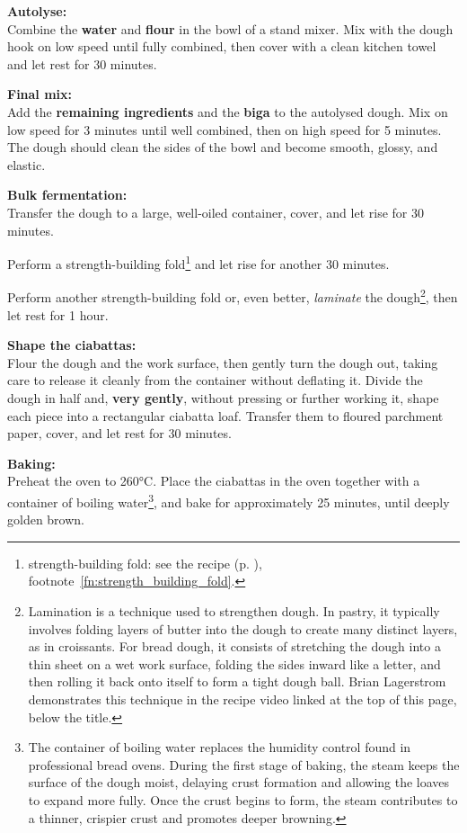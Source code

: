 \textbf{Autolyse:} \\
Combine the \textbf{water} and \textbf{flour} in the bowl of a stand mixer.
Mix with the dough hook on low speed until fully combined, then cover with a clean kitchen towel and let rest for 30 minutes.

\textbf{Final mix:} \\
Add the \textbf{remaining ingredients} and the \textbf{biga} to the autolysed dough. Mix on low speed for 3 minutes until well combined, then on high speed for 5 minutes.
The dough should clean the sides of the bowl and become smooth, glossy, and elastic.

\textbf{Bulk fermentation:} \\
Transfer the dough to a large, well-oiled container, cover, and let rise for 30 minutes.

Perform a strength-building fold\footnote{strength-building fold: see the recipe  (p. \pageref{pizza_napolitana}), footnote~\ref{fn:strength_building_fold}.} and let rise for another 30 minutes.

Perform another strength-building fold or, even better, \textit{laminate} the dough\footnote{Lamination is a technique used to strengthen dough. In pastry, it typically involves folding layers of butter into the dough to create many distinct layers, as in croissants. For bread dough, it consists of stretching the dough into a thin sheet on a wet work surface, folding the sides inward like a letter, and then rolling it back onto itself to form a tight dough ball. Brian Lagerstrom demonstrates this technique in the recipe video linked at the top of this page, below the title.}, then let rest for 1 hour.

\textbf{Shape the ciabattas:} \\
Flour the dough and the work surface, then gently turn the dough out, taking care to release it cleanly from the container without deflating it.
Divide the dough in half and, \textbf{very gently}, without pressing or further working it, shape each piece into a rectangular ciabatta loaf.
Transfer them to floured parchment paper, cover, and let rest for 30 minutes.

\textbf{Baking:} \\
Preheat the oven to 260°C.
Place the ciabattas in the oven together with a container of boiling water\footnote{The container of boiling water replaces the humidity control found in professional bread ovens. During the first stage of baking, the steam keeps the surface of the dough moist, delaying crust formation and allowing the loaves to expand more fully. Once the crust begins to form, the steam contributes to a thinner, crispier crust and promotes deeper browning.}, and bake for approximately 25 minutes, until deeply golden brown.

\begin{recipeblock}
	
\end{recipeblock}